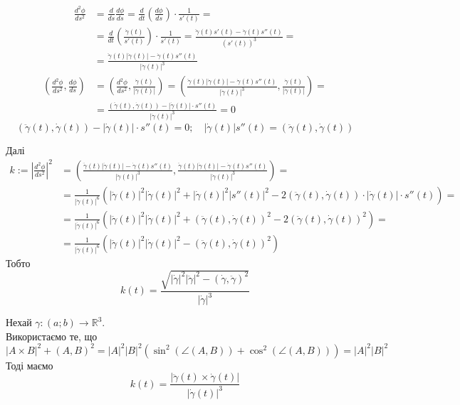 \documentclass[10pt, a4paper]{article} %
\newcommand{\R}{\mathbb{R}}
\begin{document}
\begin{align*}
    \frac{d^2\phi}{ds^2} &= \frac{d}{ds}\frac{d\phi}{ds} = \frac{d}{dt}\left(\frac{d\phi}{ds}\right) \cdot \frac{1}{s'(t)} = \\
    &= \frac{d}{dt}\left(\frac{\dot \gamma(t)}{s'(t)}\right) \cdot \frac{1}{s'(t)} = 
    \frac{\ddot \gamma(t) s'(t) - \dot\gamma(t) s''(t)}{(s'(t))^3} = \\
    &= \frac{\ddot \gamma(t) |\dot \gamma(t)| - \dot\gamma(t) s''(t)}{|\dot \gamma(t)|^3}
\end{align*}
\begin{align*}
    \left(\frac{d^2\phi}{ds^2}, \frac{d\phi}{ds}\right) &= 
    \left(\frac{d^2\phi}{ds^2}, \frac{\dot \gamma(t)}{|\dot \gamma(t)|}\right) 
    = \left(\frac{\ddot \gamma(t) |\dot \gamma(t)| - \dot\gamma(t) s''(t)}{|\dot \gamma(t)|^3}, \frac{\dot \gamma(t)}{|\dot \gamma(t)|}\right) = \\
    &= \frac{(\ddot\gamma(t), \dot\gamma(t)) - |\dot\gamma(t)|\cdot s''(t)}{|\dot\gamma(t)|^3} = 0
\end{align*}
\begin{equation*}\label{eqn:2.2.2}
    (\ddot\gamma(t), \dot\gamma(t)) - |\dot\gamma(t)|\cdot s''(t) = 0; \quad |\dot\gamma(t)|s''(t) = (\ddot\gamma(t), \dot\gamma(t))
\end{equation*}

Далі
\begin{align*}
    k := \left|\frac{d^2\phi}{ds^2}\right|^2 &= 
    \left(\frac{\ddot \gamma(t) |\dot \gamma(t)| - \dot\gamma(t) s''(t)}{|\dot \gamma(t)|^3}, \frac{\ddot \gamma(t) |\dot \gamma(t)| - \dot\gamma(t) s''(t)}{|\dot \gamma(t)|^3}\right) =\\
    &= \frac{1}{|\dot \gamma(t)|^6} \left(  |\ddot\gamma(t)|^2|\dot\gamma(t)|^2 + |\dot\gamma(t)|^2|s''(t)|^2 - 2 (\ddot\gamma(t), \dot\gamma(t)) \cdot |\dot\gamma(t)|\cdot s''(t)  \right) = \\
    &= \frac{1}{|\dot \gamma(t)|^6} \left(  |\ddot\gamma(t)|^2|\dot\gamma(t)|^2 + (\ddot\gamma(t), \dot\gamma(t))^2 - 2 (\ddot\gamma(t), \dot\gamma(t))^2  \right) = \\
    &= \frac{1}{|\dot \gamma(t)|^6} \left(  |\ddot\gamma(t)|^2|\dot\gamma(t)|^2 - (\ddot\gamma(t), \dot\gamma(t))^2 \right)
\end{align*}
Тобто 
\[k(t) = \frac{\sqrt{|\dot\gamma|^2|\ddot\gamma|^2 - (\dot\gamma,\ddot\gamma)^2}}{|\dot\gamma|^3}\]

Нехай $\gamma : (a;b) \to \R^3$. \\
Використаємо те, що
$|A \times B|^2 + (A,B)^2 = |A|^2|B|^2(\sin^2(\angle(A,B)) + \cos^2(\angle(A,B))) = |A|^2|B|^2$\\
Тоді маємо
\[k(t) = \frac{|\ddot\gamma(t) \times \dot\gamma(t)|}{|\dot\gamma(t)|^3}\]
\end{document}
